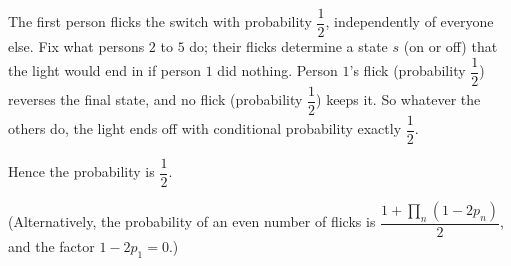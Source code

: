 The first person flicks the switch with probability $\dfrac{1}{2}$, independently of everyone else. Fix what persons $2$ to $5$ do; their flicks determine a state $s$ (on or off) that the light would end in if person $1$ did nothing. Person $1$'s flick (probability $\dfrac{1}{2}$) reverses the final state, and no flick (probability $\dfrac{1}{2}$) keeps it. So whatever the others do, the light ends off with conditional probability exactly $\dfrac{1}{2}$.

Hence the probability is $\boxed{\dfrac{1}{2}}$.

(Alternatively, the probability of an even number of flicks is $\dfrac{1+\prod_{n}(1-2p_n)}{2}$, and the factor $1-2p_1=0$.)
